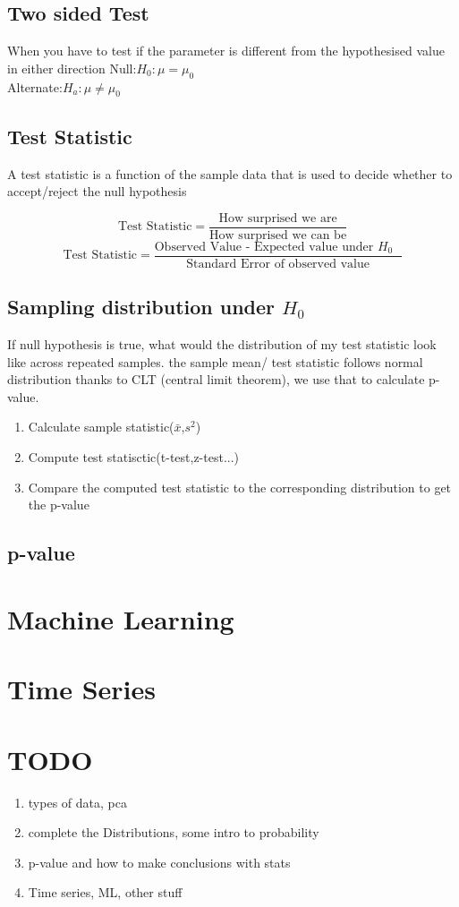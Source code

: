 \documentclass[12pt]{extarticle}
\begin{document}
\subsection{Two sided Test}
When you have to test if the parameter is different from the hypothesised value
in either direction
Null:$H_0: \mu = \mu_0 $ \\
Alternate:$H_a: \mu \neq \mu_0$

\subsection{Test Statistic}
A test statistic is a function of the sample data that is used to decide
whether to accept/reject the null hypothesis

$$ \text{Test Statistic} = \frac{\text{How surprised we are}}{\text{How surprised we can be}} $$
$$ \text{Test Statistic} =
\frac{\text{Observed Value - Expected value under $H_0$ }} {\text{Standard Error of observed value}} $$

\subsection{Sampling distribution under $H_0$}
If null hypothesis is true, what would the distribution of my test statistic look like 
across repeated samples. the sample mean/ test statistic follows normal distribution 
thanks to CLT (central limit theorem), we use that to calculate p-value.
\begin{enumerate}
    \item Calculate sample statistic($\bar{x}$,$s^2$)
    \item Compute test statisctic(t-test,z-test...)
    \item Compare the computed test statistic to the corresponding distribution
        to get the p-value
\end{enumerate}

\subsection{p-value}


\section{Machine Learning}
\section{Time Series}


\section{TODO}
\begin{enumerate}
    \item types of data, pca
    \item complete the Distributions, some intro to probability
    \item p-value and how to make conclusions with stats
    \item Time series, ML, other stuff

\end{enumerate}
\end{document}
